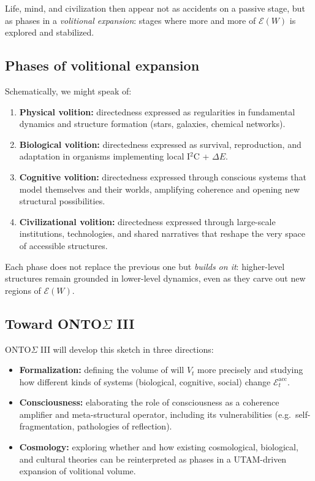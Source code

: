 \documentclass[12pt,a4paper]{report}
\newcommand{\Will}{W}
\begin{document}
Life, mind, and civilization then appear not as accidents on a passive stage, but as phases in a \emph{volitional expansion}: stages where more and more of \(\mathcal{E}(\Will)\) is explored and stabilized.

\subsection*{Phases of volitional expansion}

Schematically, we might speak of:

\begin{enumerate}[leftmargin=2em]
    \item \textbf{Physical volition:} directedness expressed as regularities in fundamental dynamics and structure formation (stars, galaxies, chemical networks).
    \item \textbf{Biological volition:} directedness expressed as survival, reproduction, and adaptation in organisms implementing local I$^2$C + $\Delta E$.
    \item \textbf{Cognitive volition:} directedness expressed through conscious systems that model themselves and their worlds, amplifying coherence and opening new structural possibilities.
    \item \textbf{Civilizational volition:} directedness expressed through large-scale institutions, technologies, and shared narratives that reshape the very space of accessible structures.
\end{enumerate}

Each phase does not replace the previous one but \emph{builds on it}: higher-level structures remain grounded in lower-level dynamics, even as they carve out new regions of \(\mathcal{E}(\Will)\).

\subsection*{Toward ONTO$\Sigma$ III}

ONTO$\Sigma$ III will develop this sketch in three directions:

\begin{itemize}[leftmargin=2em]
    \item \textbf{Formalization:} defining the volume of will \(V_t\) more precisely and studying how different kinds of systems (biological, cognitive, social) change \(\mathcal{E}_t^{\mathrm{acc}}\).
    \item \textbf{Consciousness:} elaborating the role of consciousness as a coherence amplifier and meta-structural operator, including its vulnerabilities (e.g.\ self-fragmentation, pathologies of reflection).
    \item \textbf{Cosmology:} exploring whether and how existing cosmological, biological, and cultural theories can be reinterpreted as phases in a UTAM-driven expansion of volitional volume.
\end{itemize}
\end{document}
